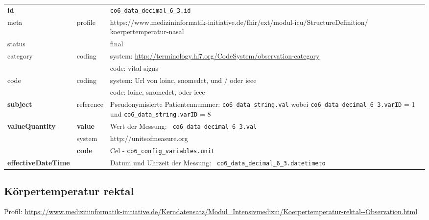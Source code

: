 \begin{longtable}{|l|l|p{7.5cm}|}
	\hline
	\rowcolor{lightgray} \multicolumn{3}{|l|}{Data Mapping (inhaltlich)} \\ \hline
	\textbf{id} &  & \texttt{co6\_data\_decimal\_6\_3.id} \\ \hline
	meta & profile & https://www.medizininformatik-initiative.de/fhir/ext/modul-icu/StructureDefinition/ koerpertemperatur-nasal \\ \hline 
	status &  & final   \\ \hline 
	category & coding & system: \url{http://terminology.hl7.org/CodeSystem/observation-category} \\
	\cline{3-3}
	& & code: vital-signs \\ \hline
	code & coding & system: Url von \ac{loinc}, \ac{snomedct}, und / oder \ac{ieee} \\ 
	\cline{3-3} 
	&  & code: \ac{loinc}, \ac{snomedct}, oder \ac{ieee} \\ \hline
	\textbf{subject} & reference & Pseudonymisierte Patientennummer: \texttt{co6\_data\_string.val} wobei \texttt{co6\_data\_decimal\_6\_3.varID} = 1 und \texttt{co6\_data\_string.varID} = 8 \\ \hline
	\textbf{valueQuantity}  & \textbf{value} & Wert der Messung: \texttt{
		co6\_data\_decimal\_6\_3.val} \\
	\cline{2-3}
	& system & http://unitsofmeasure.org \\
	\cline{2-3}
	& \textbf{code} & Cel - \texttt{co6\_config\_variables.unit} \\ \hline
	\textbf{effectiveDateTime}  & & Datum und Uhrzeit der Messung: \texttt{
		co6\_data\_decimal\_6\_3.datetimeto} \\ \hline
\end{longtable}

\subsection{Körpertemperatur rektal} 
Profil: \url{https://www.medizininformatik-initiative.de/Kerndatensatz/Modul_Intensivmedizin/Koerpertemperatur-rektal--Observation.html}


